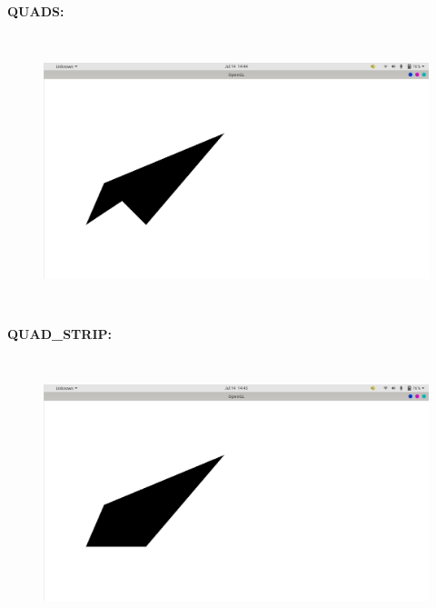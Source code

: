 \documentclass[12pt,letterpaper]{article}
\begin{document}
\newpage
\textbf{QUADS:}

\textbf{}
\begin{figure}[h]
    \centering
    \includegraphics[height=8cm, keepaspectratio]{Basics/Outputs/Quad.png}
\end{figure}

\newpage
\textbf{QUAD\_STRIP:}

\textbf{}
\begin{figure}[h]
    \centering
    \includegraphics[height=8cm, keepaspectratio]{Basics/Outputs/Quad_strip.png}
\end{figure}
\end{document}
